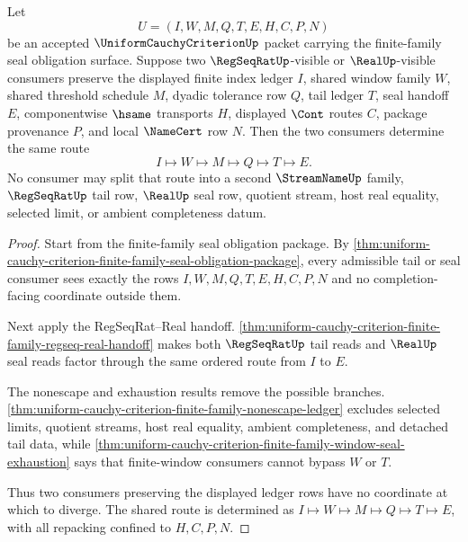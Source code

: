 \begin{theorem}
\label{thm:uniform-cauchy-criterion-finite-family-shared-seal-route-determinacy}
Let
$$
U=(I,W,M,Q,T,E,H,C,P,N)
$$
be an accepted $\UniformCauchyCriterionUp$ packet carrying the finite-family seal obligation surface. Suppose two $\RegSeqRatUp$-visible or $\RealUp$-visible consumers preserve the displayed finite index ledger $I$, shared window family $W$, shared threshold schedule $M$, dyadic tolerance row $Q$, tail ledger $T$, seal handoff $E$, componentwise $\hsame$ transports $H$, displayed $\Cont$ routes $C$, package provenance $P$, and local $\NameCert$ row $N$. Then the two consumers determine the same route
$$
I \longmapsto W \longmapsto M \longmapsto Q \longmapsto T \longmapsto E.
$$
No consumer may split that route into a second $\StreamNameUp$ family, $\RegSeqRatUp$ tail row, $\RealUp$ seal row, quotient stream, host real equality, selected limit, or ambient completeness datum.
\end{theorem}
\begin{proof}
Start from the finite-family seal obligation package. By \autoref{thm:uniform-cauchy-criterion-finite-family-seal-obligation-package}, every admissible tail or seal consumer sees exactly the rows $I,W,M,Q,T,E,H,C,P,N$ and no completion-facing coordinate outside them.

Next apply the RegSeqRat--Real handoff. \autoref{thm:uniform-cauchy-criterion-finite-family-regseq-real-handoff} makes both $\RegSeqRatUp$ tail reads and $\RealUp$ seal reads factor through the same ordered route from $I$ to $E$.

The nonescape and exhaustion results remove the possible branches. \autoref{thm:uniform-cauchy-criterion-finite-family-nonescape-ledger} excludes selected limits, quotient streams, host real equality, ambient completeness, and detached tail data, while \autoref{thm:uniform-cauchy-criterion-finite-family-window-seal-exhaustion} says that finite-window consumers cannot bypass $W$ or $T$.

Thus two consumers preserving the displayed ledger rows have no coordinate at which to diverge. The shared route is determined as $I \longmapsto W \longmapsto M \longmapsto Q \longmapsto T \longmapsto E$, with all repacking confined to $H,C,P,N$.
\end{proof}

